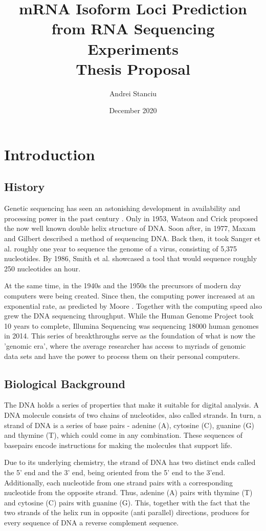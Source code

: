 \documentclass[12pt]{article}
\title{%
    mRNA Isoform Loci Prediction from RNA Sequencing Experiments \\
    \large Thesis Proposal}
\author{Andrei Stanciu}
\date{December 2020}
\begin{document}
\maketitle

\section{Introduction}

\subsection{History}
Genetic sequencing has seen an astonishing development in availability and processing power in the past century
\cite{Hood2003}. Only in 1953, Watson and Crick \cite{WATSON1953} proposed the now well known double helix structure of DNA. Soon after, in 1977, Maxam and Gilbert \cite{Maxam1977} described a method of sequencing DNA. Back then, it took Sanger et al. \cite{Sanger1977} roughly one year to sequence the genome of a virus, consisting of 5,375 nucleotides. By 1986, Smith et al. \cite{Smith1986} showcased a tool that would sequence roughly 250 nucleotides an hour. 

At the same time, in the 1940s and the 1950s the precursors of modern day computers were being created. Since then, the computing power increased at an exponential rate, as predicted by Moore \cite{Moore2006}. Together with the computing speed also grew the DNA sequencing throughput. While the Human Genome Project took 10 years to complete, Illumina Sequencing \cite{illuminaSeq} was sequencing 18000 human genomes in 2014. This series of breakthroughs serve as the foundation of what is now the 'genomic era', where the average researcher has access to myriads of genomic data sets and have the power to process them on their personal computers.   

\subsection{Biological Background}
The DNA holds a series of properties that make it suitable for digital analysis. A DNA molecule consists of two chains of nucleotides, also called strands. In turn, a strand of DNA is a series of  base pairs - adenine (A), cytosine (C), guanine (G) and thymine (T), which could come in any combination. These sequences of basepairs encode instructions for making the molecules that support life. 


Due to its underlying chemistry, the strand of DNA has two distinct ends called the 5' end and the 3' end, being oriented from the 5' end to the 3'end. Additionally, each nucleotide from one strand pairs with a corresponding nucleotide from the opposite strand. Thus, adenine (A) pairs with thymine (T) and cytosine (C) pairs with guanine (G). This, together with the fact that the two strands of the helix run in opposite (anti parallel) directions, produces for every sequence of DNA a reverse complement sequence. 
\end{document}
